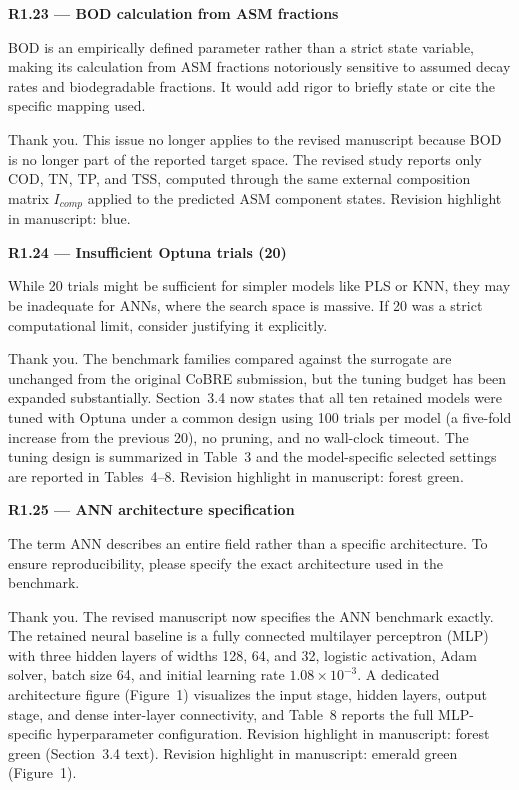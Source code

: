 \documentclass[a4paper,11pt]{article}
\newcommand{\reviewlabel}[1]{\noindent\textbf{\textcolor{accentblue}{#1}}\par\medskip}
\newcommand{\revhighlight}[2]{\textcolor{#1}{Revision highlight in manuscript: #2.}}
\begin{document}
\reviewlabel{R1.23 --- BOD calculation from ASM fractions}
\begin{reviewbox}
BOD is an empirically defined parameter rather than a strict state variable, making its calculation from ASM fractions notoriously sensitive to assumed decay rates and biodegradable fractions. It would add rigor to briefly state or cite the specific mapping used.
\end{reviewbox}

Thank you. This issue no longer applies to the revised manuscript because BOD is no longer part of the reported target space. The revised study reports only COD, TN, TP, and TSS, computed through the same external composition matrix $I_{comp}$ applied to the predicted ASM component states. \revhighlight{revDefault}{blue}

\reviewlabel{R1.24 --- Insufficient Optuna trials (20)}
\begin{reviewbox}
While 20 trials might be sufficient for simpler models like PLS or KNN, they may be inadequate for ANNs, where the search space is massive. If 20 was a strict computational limit, consider justifying it explicitly.
\end{reviewbox}

Thank you. The benchmark families compared against the surrogate are unchanged from the original CoBRE submission, but the tuning budget has been expanded substantially. Section~3.4 now states that all ten retained models were tuned with Optuna under a common design using 100 trials per model (a five-fold increase from the previous 20), no pruning, and no wall-clock timeout. The tuning design is summarized in Table~3 and the model-specific selected settings are reported in Tables~4--8. \revhighlight{revRtwoFour}{forest green}

\reviewlabel{R1.25 --- ANN architecture specification}
\begin{reviewbox}
The term ANN describes an entire field rather than a specific architecture. To ensure reproducibility, please specify the exact architecture used in the benchmark.
\end{reviewbox}

Thank you. The revised manuscript now specifies the ANN benchmark exactly. The retained neural baseline is a fully connected multilayer perceptron (MLP) with three hidden layers of widths 128, 64, and 32, logistic activation, Adam solver, batch size 64, and initial learning rate $1.08 \times 10^{-3}$. A dedicated architecture figure (Figure~1) visualizes the input stage, hidden layers, output stage, and dense inter-layer connectivity, and Table~8 reports the full MLP-specific hyperparameter configuration. \revhighlight{revRtwoFour}{forest green (Section~3.4 text)} \revhighlight{revRoneTwentyFive}{emerald green (Figure~1)}
\end{document}
